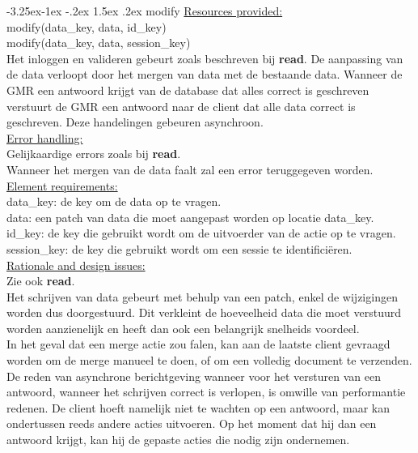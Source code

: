 \documentclass[a4paper,10pt]{article}
\makeatletter
\renewcommand\paragraph{\@startsection{paragraph}{4}{\z@}%
  {-3.25ex\@plus -1ex \@minus -.2ex}%
  {1.5ex \@plus .2ex}%
  {\normalfont\normalsize\bfseries}}
\makeatother
\begin{document}
\paragraph{modify}
\underline{Resources provided:}\\
modify(data\_key, data, id\_key)\\
modify(data\_key, data, session\_key)\\
Het inloggen en valideren gebeurt zoals beschreven bij \textbf{read}.
De aanpassing van de data verloopt door het mergen van data met de bestaande data.  Wanneer de GMR een antwoord krijgt van de database dat alles correct is geschreven verstuurt de GMR een antwoord naar de client dat alle data correct is geschreven.  Deze handelingen gebeuren asynchroon.\\

\underline{Error handling:}\\
Gelijkaardige errors zoals bij \textbf{read}.\\
Wanneer het mergen van de data faalt zal een error teruggegeven worden.\\

\underline{Element requirements:}\\
data\_key: de key om de data op te vragen.\\
data: een patch van data die moet aangepast worden op locatie data\_key.\\ 
id\_key: de key die gebruikt wordt om de uitvoerder van de actie op te vragen.\\
session\_key: de key die gebruikt wordt om een sessie te identifici\"{e}ren.\\

\underline{Rationale and design issues:}\\
Zie ook \textbf{read}.\\
Het schrijven van data gebeurt met behulp van een patch, enkel de wijzigingen worden dus doorgestuurd.  Dit verkleint de hoeveelheid data die moet verstuurd worden aanzienelijk en heeft dan ook een belangrijk snelheids voordeel.\\
In het geval dat een merge actie zou falen, kan aan de laatste client gevraagd worden om de merge manueel te doen, of om een volledig document te verzenden.\\
De reden van asynchrone berichtgeving wanneer voor het versturen van een antwoord, wanneer het schrijven correct is verlopen, is omwille van performantie redenen.  De client hoeft namelijk niet te wachten op een antwoord, maar kan ondertussen reeds andere acties uitvoeren.  Op het moment dat hij dan een antwoord krijgt, kan hij de gepaste acties die nodig zijn ondernemen.
\end{document}
